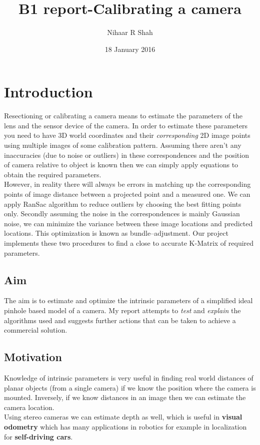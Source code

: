 \documentclass[titlepage]{article}
\title{B1 report-Calibrating a camera}
\author{Nihaar R Shah}
\date{18 January 2016}
\begin{document}
\maketitle
\section{Introduction}
Resectioning or calibrating a camera means to estimate the parameters of the lens and the sensor device of the camera. In order to estimate these parameters you need to have 3D world coordinates and their \textit{corresponding} 2D image points using multiple images of some calibration pattern. Assuming there aren't any inaccuracies (due to noise or outliers) in these correspondences and the position of camera relative to object is known then we can simply apply equations to obtain the required parameters. \\
However, in reality there will always be errors in matching up the corresponding points of image distance between a projected point and a measured one. We can apply RanSac algorithm to reduce outliers by choosing the best fitting points only. Secondly assuming the noise in the correspondences is mainly Gaussian noise, we can minimize the variance between these image locations and predicted locations. This optimization is known as bundle–adjustment. Our project implements these two procedures to find a close to accurate K-Matrix of required parameters.
\subsection{Aim}
The aim is to estimate and optimize the intrinsic parameters of a simplified ideal pinhole based model of a camera. My report attempts to \textit{test} and \textit{explain} the algorithms used and suggests further actions that can be taken to achieve a commercial solution.
\subsection{Motivation}
Knowledge of intrinsic parameters is very useful in finding real world distances of planar objects (from a single camera) if we know the position where the camera is mounted. Inversely, if we know distances in an image then we can estimate the camera location.\\
Using stereo cameras we can estimate depth as well, which is useful in \textbf{visual odometry} which has many applications in robotics for example in localization for \textbf{self-driving cars}.
\end{document}
